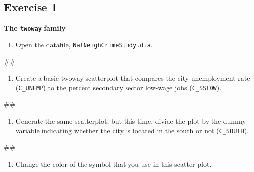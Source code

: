 \documentclass[
]{book}
\newenvironment{Shaded}{\begin{snugshade}}{\end{snugshade}}
\newcommand{\NormalTok}[1]{#1}
\providecommand{\tightlist}{%
  \setlength{\itemsep}{0pt}\setlength{\parskip}{0pt}}
\begin{document}
\hypertarget{exercise-1-9}{%
\subsection{Exercise 1}\label{exercise-1-9}}

\textbf{The \texttt{twoway} family}

\begin{enumerate}
\def\labelenumi{\arabic{enumi}.}
\tightlist
\item
  Open the datafile, \texttt{NatNeighCrimeStudy.dta}.
\end{enumerate}

\begin{Shaded}
\begin{Highlighting}[]
\NormalTok{\#\#}
\end{Highlighting}
\end{Shaded}

\begin{enumerate}
\def\labelenumi{\arabic{enumi}.}
\setcounter{enumi}{1}
\tightlist
\item
  Create a basic twoway scatterplot that compares the city unemployment rate (\texttt{C\_UNEMP}) to the percent secondary sector low-wage jobs (\texttt{C\_SSLOW}).
\end{enumerate}

\begin{Shaded}
\begin{Highlighting}[]
\NormalTok{\#\#}
\end{Highlighting}
\end{Shaded}

\begin{enumerate}
\def\labelenumi{\arabic{enumi}.}
\setcounter{enumi}{2}
\tightlist
\item
  Generate the same scatterplot, but this time, divide the plot by the dummy variable indicating whether the city is located in the south or not (\texttt{C\_SOUTH}).
\end{enumerate}

\begin{Shaded}
\begin{Highlighting}[]
\NormalTok{\#\#}
\end{Highlighting}
\end{Shaded}

\begin{enumerate}
\def\labelenumi{\arabic{enumi}.}
\setcounter{enumi}{3}
\tightlist
\item
  Change the color of the symbol that you use in this scatter plot.
\end{enumerate}
\end{document}
